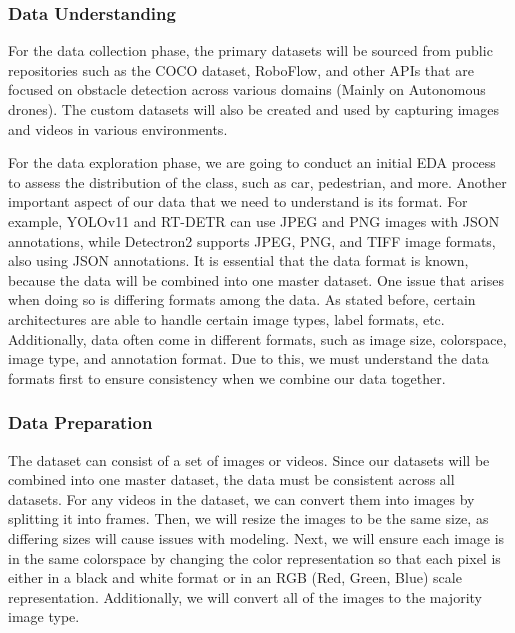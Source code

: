 \documentclass[stu,12pt,floatsintext]{apa7}
\begin{document}
\subsubsection{Data Understanding}
For the data collection phase, the primary datasets will be sourced from public repositories such as the COCO dataset, RoboFlow, and other APIs that are focused on obstacle detection across various domains (Mainly on Autonomous drones). The custom datasets will also be created and used by capturing images and videos in various environments.

For the data exploration phase, we are going to conduct an initial EDA process to assess the distribution of the class, such as car, pedestrian, and more. Another important aspect of our data that we need to understand is its format. For example, YOLOv11 and RT-DETR can use JPEG and PNG images with JSON annotations, while Detectron2 supports JPEG, PNG, and TIFF image formats, also using JSON annotations. It is essential that the data format is known, because the data will be combined into one master dataset. One issue that arises when doing so is differing formats among the data. As stated before, certain architectures are able to handle certain image types, label formats, etc. Additionally, data often come in different formats, such as image size, colorspace, image type, and annotation format. Due to this, we must understand the data formats first to ensure consistency when we combine our data together.


\subsubsection{Data Preparation}
The dataset can consist of a set of images or videos. Since our datasets will be combined into one master dataset, the data must be consistent across all datasets. For any videos in the dataset, we can convert them into images by splitting it into frames. Then, we will resize the images to be the same size, as differing sizes will cause issues with modeling. Next, we will ensure each image is in the same colorspace by changing the color representation so that each pixel is either in a black and white format or in an RGB (Red, Green, Blue) scale representation. Additionally, we will convert all of the images to the majority image type.
\end{document}
